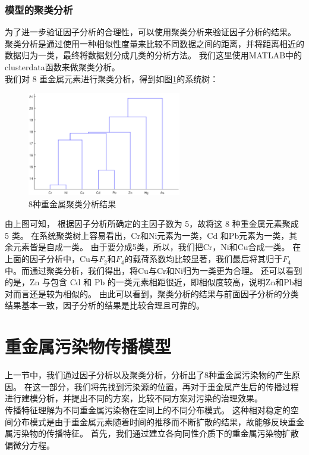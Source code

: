 \documentclass[a4paper]{article}
\begin{document}
\section{模型的聚类分析}
为了进一步验证因子分析的合理性，可以使用聚类分析来验证因子分析的结果。
聚类分析是通过使用一种相似性度量来比较不同数据之间的距离，并将距离相近的数据归为一类，最终将数据划分成几类的分析方法。
我们这里使用MATLAB中的clusterdata函数来做聚类分析。 \\
\indent 我们对 8 重金属元素进行聚类分析，得到如图\ref{fig:cluster}的系统树：
\begin{figure}[H]
    \includegraphics[width=0.6\textwidth,bb=80 420 500 720]{pictures/cluster.eps}
    \caption{8种重金属聚类分析结果}
    \label{fig:cluster}
\end{figure}
由上图可知， 根据因子分析所确定的主因子数为 5，故将这 8 种重金属元素聚成 5 类。
在系统聚类树上容易看出，Cr和Ni元素为一类，Cd 和Pb元素为一类，其余元素皆是自成一类。
由于要分成5类，所以，我们把Cr，Ni和Cu合成一类。
在上面的因子分析中，Cu与$F_2$和$F_4$的载荷系数均比较显著，我们最后将其归于$F_4$中。而通过聚类分析，我们得出，将Cu与Cr和Ni归为一类更为合理。
还可以看到的是，Zn 与包含 Cd 和 Pb 的一类元素相距很近，即相似度较高，说明Zn和Pb相对而言还是较为相似的。
由此可以看到，聚类分析的结果与前面因子分析的分类结果基本一致，因子分析的结果是比较合理且可靠的。


\part{重金属污染物传播模型}
上一节中，我们通过因子分析以及聚类分析，分析出了8种重金属污染物的产生原因。
在这一部分，我们将先找到污染源的位置，再对于重金属产生后的传播过程进行建模分析，并提出不同的方案，比较不同方案对污染的治理效果。\\
\indent 传播特征理解为不同重金属污染物在空间上的不同分布模式。
这种相对稳定的空间分布模式是由于重金属元素随着时间的推移而不断扩散的结果，故能够反映重金属污染物的传播特征。
首先，我们通过建立各向同性介质下的重金属污染物扩散偏微分方程。
\end{document}
